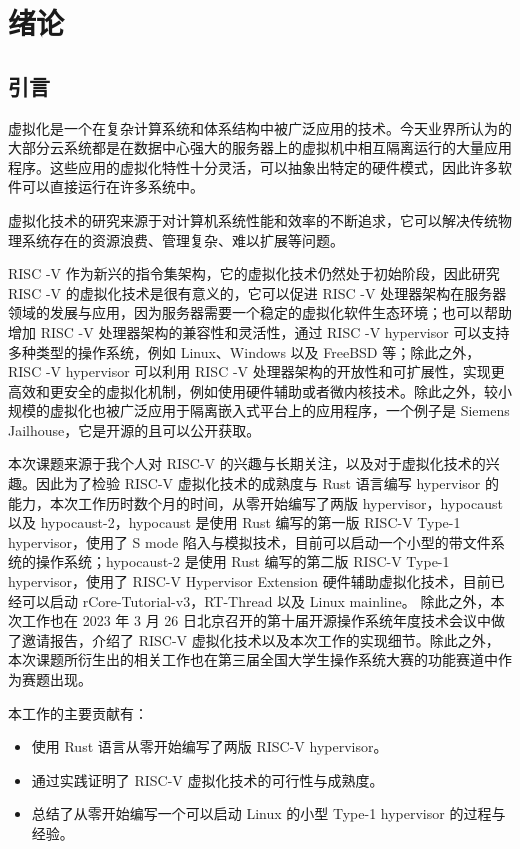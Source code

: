 

\baselineskip=20pt

\chapter{绪论}
\section{引言}

虚拟化是一个在复杂计算系统和体系结构中被广泛应用的技术。今天业界所认为的大部分云系统都是在数据中心强大的服务器上的虚拟机中相互隔离运行的大量应用程序。这些应用的虚拟化特性十分灵活，可以抽象出特定的硬件模式，因此许多软件可以直接运行在许多系统中。

虚拟化技术的研究来源于对计算机系统性能和效率的不断追求，它可以解决传统物理系统存在的资源浪费、管理复杂、难以扩展等问题。

RISC -V 作为新兴的指令集架构，它的虚拟化技术仍然处于初始阶段，因此研究 RISC -V 的虚拟化技术是很有意义的，它可以促进 RISC -V 处理器架构在服务器领域的发展与应用，因为服务器需要一个稳定的虚拟化软件生态环境；也可以帮助增加 RISC -V 处理器架构的兼容性和灵活性，通过 RISC -V hypervisor 可以支持多种类型的操作系统，例如 Linux、Windows 以及 FreeBSD 等；除此之外，RISC -V hypervisor 可以利用 RISC -V 处理器架构的开放性和可扩展性，实现更高效和更安全的虚拟化机制，例如使用硬件辅助或者微内核技术。除此之外，较小规模的虚拟化也被广泛应用于隔离嵌入式平台上的应用程序，一个例子是 Siemens Jailhouse\cite{sinitsyn2015jailhouse}，它是开源的且可以公开获取。

本次课题来源于我个人对 RISC-V 的兴趣与长期关注，以及对于虚拟化技术的兴趣。因此为了检验 RISC-V 虚拟化技术的成熟度与 Rust 语言编写 hypervisor 的能力，本次工作历时数个月的时间，从零开始编写了两版 hypervisor，hypocaust 以及 hypocaust-2，hypocaust 是使用 Rust 编写的第一版 RISC-V Type-1 hypervisor，使用了 S mode 陷入与模拟技术，目前可以启动一个小型的带文件系统的操作系统；hypocaust-2 是使用 Rust 编写的第二版 RISC-V Type-1 hypervisor，使用了 RISC-V Hypervisor Extension 硬件辅助虚拟化技术，目前已经可以启动 rCore-Tutorial-v3，RT-Thread 以及 Linux mainline。
除此之外，本次工作也在 2023 年 3 月 26 日北京召开的第十届开源操作系统年度技术会议中做了邀请报告，介绍了 RISC-V 虚拟化技术以及本次工作的实现细节。除此之外，本次课题所衍生出的相关工作也在第三届全国大学生操作系统大赛的功能赛道中作为赛题出现。

本工作的主要贡献有：
\begin{itemize}
    \item 使用 Rust 语言从零开始编写了两版 RISC-V hypervisor。
    \item 通过实践证明了 RISC-V 虚拟化技术的可行性与成熟度。
    \item 总结了从零开始编写一个可以启动 Linux 的小型 Type-1 hypervisor 的过程与经验。
\end{itemize}

